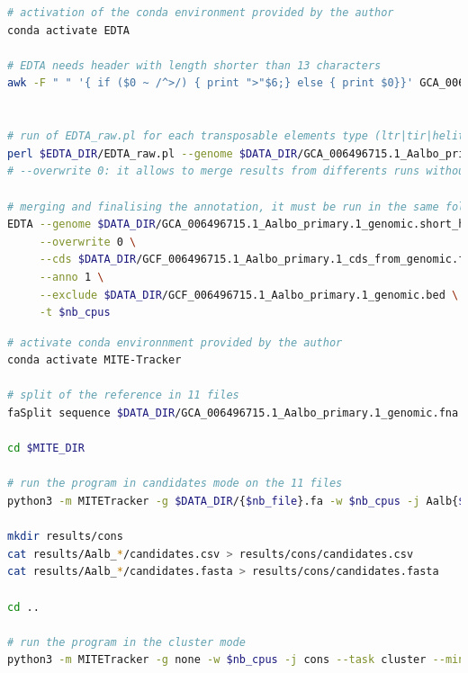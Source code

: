 \documentclass[10pt]{article}
\begin{document}
\vspace{0.5cm}

\begin{lstlisting}[language=bash, frame=trb, caption=Commandes \texttt{EDTA}., label=edta]
# activation of the conda environment provided by the author
conda activate EDTA

# EDTA needs header with length shorter than 13 characters
awk -F " " '{ if ($0 ~ /^>/) { print ">"$6;} else { print $0}}' GCA_006496715.1_Aalbo_primary.1_genomic.fna  | sed -e 's/,//' > GCA_006496715.1_Aalbo_primary.1_genomic.short_header.fna


# run of EDTA_raw.pl for each transposable elements type (ltr|tir|helitron)
perl $EDTA_DIR/EDTA_raw.pl --genome $DATA_DIR/GCA_006496715.1_Aalbo_primary.1_genomic.short_header.fna --type ltr|tir|helitron --overwrite 0 -t $nb_cpus 
# --overwrite 0: it allows to merge results from differents runs without deleting the results previously obtained

# merging and finalising the annotation, it must be run in the same folder as previously commands
EDTA --genome $DATA_DIR/GCA_006496715.1_Aalbo_primary.1_genomic.short_header.fna \
     --overwrite 0 \
     --cds $DATA_DIR/GCF_006496715.1_Aalbo_primary.1_cds_from_genomic.fna \
     --anno 1 \
     --exclude $DATA_DIR/GCF_006496715.1_Aalbo_primary.1_genomic.bed \
     -t $nb_cpus

\end{lstlisting}

\vspace{0.5cm}

\begin{lstlisting}[language=bash, frame=trb, caption=Commandes \texttt{MITE-Tracker}., label=mite]
# activate conda environnment provided by the author
conda activate MITE-Tracker

# split of the reference in 11 files
faSplit sequence $DATA_DIR/GCA_006496715.1_Aalbo_primary.1_genomic.fna 11 Aalb

cd $MITE_DIR

# run the program in candidates mode on the 11 files
python3 -m MITETracker -g $DATA_DIR/{$nb_file}.fa -w $nb_cpus -j Aalb{$nb_file} --task candidates

mkdir results/cons
cat results/Aalb_*/candidates.csv > results/cons/candidates.csv
cat results/Aalb_*/candidates.fasta > results/cons/candidates.fasta

cd ..

# run the program in the cluster mode
python3 -m MITETracker -g none -w $nb_cpus -j cons --task cluster --min_copy_number 4
\end{lstlisting}
\end{document}

